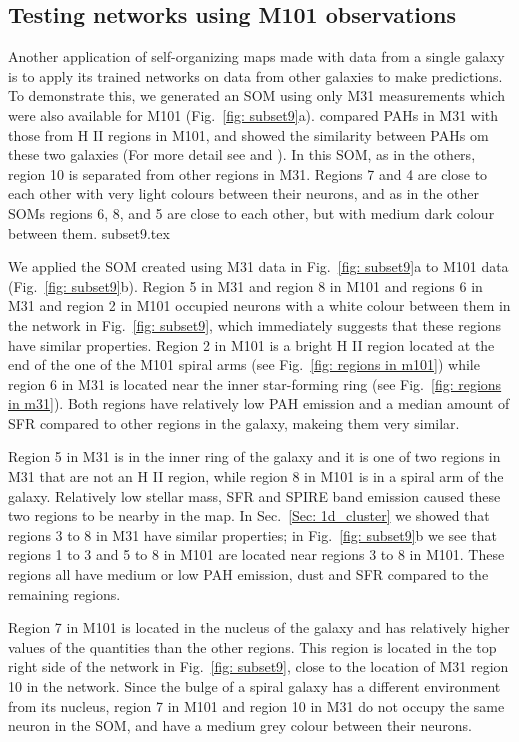     \subsection{Testing networks using M101 observations}
    Another application of self-organizing maps made with data from a single galaxy is to apply its trained networks on data from other galaxies to make predictions. %
    To demonstrate this, we generated an SOM using only M31 measurements which were also available for M101 (Fig.~\ref{fig: subset9}a). 
    \cite{Dim15} compared PAHs in M31 with those from H {\sc II} regions in M101, and showed the similarity between PAHs om these two galaxies (For more detail see \cite{Dim15} and \cite{Gordon08}).
    In this SOM, as in the others, region 10 is separated from other regions in M31.
    Regions 7 and 4 are close to each other with very light colours between their neurons, and as in the other SOMs regions 6, 8, and 5 are close to each other, but with medium dark colour between them.
    {subset9.tex}
    
    We applied the SOM created using M31 data in Fig.~\ref{fig: subset9}a to M101 data (Fig.~\ref{fig: subset9}b).
    Region 5 in M31 and region 8 in M101 and regions 6 in M31 and region 2 in M101 occupied neurons with a white colour between them in the network in Fig.~\ref{fig: subset9}, which immediately suggests that these regions have similar properties. 
    Region 2 in M101 is a bright H {\sc II} region located at the end of the one of the M101 spiral arms (see Fig.~\ref{fig: regions in m101}) while
    region 6 in M31 is located near the inner star-forming ring (see Fig.~\ref{fig: regions in m31}).
    Both regions have relatively low PAH emission and a median amount of  SFR compared to other regions in the galaxy,  makeing them very similar.
    
    Region 5 in M31 is in the inner ring of the galaxy and it is one of two regions in M31 that are not an  H {\sc II} region, while
    region 8 in M101 is in a spiral arm of the galaxy.
    Relatively low stellar mass, SFR and SPIRE band emission caused these two regions to be nearby in the map.
    In Sec.~\ref{Sec: 1d_cluster} we showed that regions 3 to 8 in M31 have similar properties; in Fig.~\ref{fig: subset9}b we see that regions 1 to 3 and 5 to 8 in M101 are located near regions 3 to 8 in M101. 
    These regions all have medium or low PAH emission, dust and SFR compared to the remaining regions.
    
    Region 7 in M101 is located in the nucleus of the galaxy and has relatively higher values of the quantities than the other regions.
    This region is located in the top right side of the network in Fig.~\ref{fig: subset9},  close to the location of M31 region 10 in the network.
    Since the bulge of a spiral galaxy has a different environment from its nucleus, region 7 in M101 and region 10 in M31 do not occupy the same neuron in the SOM, and have a medium grey colour between their neurons.

